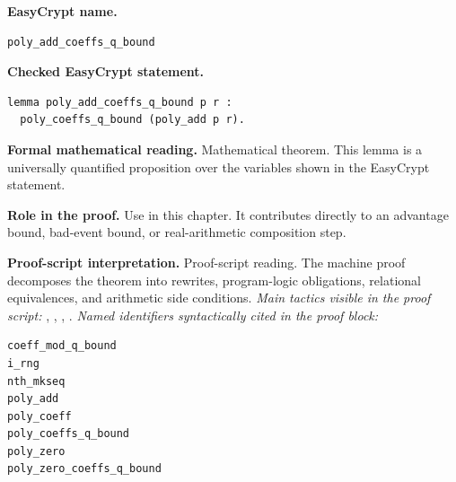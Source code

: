 \begin{formaltheorem}
\noindent\textbf{EasyCrypt name.}
\begin{lstlisting}[language=EasyCrypt,basicstyle=\ttfamily\scriptsize]
poly_add_coeffs_q_bound
\end{lstlisting}
\noindent\textbf{Checked EasyCrypt statement.}
\begin{lstlisting}[language=EasyCrypt,basicstyle=\ttfamily\scriptsize]
lemma poly_add_coeffs_q_bound p r :
  poly_coeffs_q_bound (poly_add p r).
\end{lstlisting}
\noindent\textbf{Formal mathematical reading.}
Mathematical theorem. This lemma is a universally quantified proposition over the variables shown in the EasyCrypt statement.

\noindent\textbf{Role in the proof.}
Use in this chapter. It contributes directly to an advantage bound, bad-event bound, or real-arithmetic composition step.

\noindent\textbf{Proof-script interpretation.}
Proof-script reading. The machine proof decomposes the theorem into rewrites, program-logic obligations, relational equivalences, and arithmetic side conditions.
\emph{Main tactics visible in the proof script:} , , , .
\emph{Named identifiers syntactically cited in the proof block:}
\begin{lstlisting}[language=EasyCrypt,basicstyle=\ttfamily\scriptsize]
coeff_mod_q_bound
i_rng
nth_mkseq
poly_add
poly_coeff
poly_coeffs_q_bound
poly_zero
poly_zero_coeffs_q_bound
\end{lstlisting}

\end{formaltheorem}

